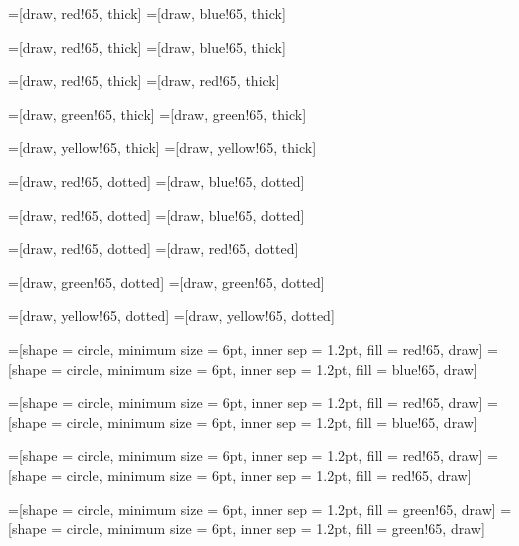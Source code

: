 \documentclass[12pt]{article}
\theoremstyle{plain}
\theoremstyle{definition}
\theoremstyle{remark}
\begin{document}
	
	=[draw, red!65, thick]
	=[draw, blue!65, thick]
	
		=[draw, red!65, thick]
		=[draw, blue!65, thick]
		
			=[draw, red!65, thick]
			=[draw, red!65, thick]
			
				=[draw, green!65, thick]
				=[draw, green!65, thick]
		
						=[draw, yellow!65, thick]
						=[draw, yellow!65, thick]
						
	
	=[draw, red!65, dotted]
    =[draw, blue!65, dotted]
    
    	=[draw, red!65, dotted]
    	=[draw, blue!65, dotted]
    	
    		=[draw, red!65, dotted]
    		=[draw, red!65, dotted]
    		
    			=[draw, green!65, dotted]
    			=[draw, green!65, dotted]
    			
    				=[draw, yellow!65, dotted]
    				=[draw, yellow!65, dotted]
	
	=[shape = circle, minimum size = 6pt, inner sep = 1.2pt, fill = red!65, draw]
	=[shape = circle, minimum size = 6pt, inner sep = 1.2pt, fill = blue!65, draw]
	
		=[shape = circle, minimum size = 6pt, inner sep = 1.2pt, fill = red!65, draw]
		=[shape = circle, minimum size = 6pt, inner sep = 1.2pt, fill = blue!65, draw]
		
				=[shape = circle, minimum size = 6pt, inner sep = 1.2pt, fill = red!65, draw]
				=[shape = circle, minimum size = 6pt, inner sep = 1.2pt, fill = red!65, draw]
				
					=[shape = circle, minimum size = 6pt, inner sep = 1.2pt, fill = green!65, draw]
					=[shape = circle, minimum size = 6pt, inner sep = 1.2pt, fill = green!65, draw]
					
\end{document}

